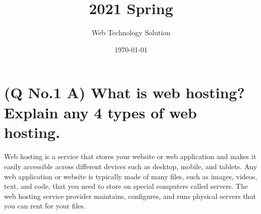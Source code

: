 \documentclass[11pt]{article}
\title{ 2021 Spring}
\author{ Web Technology Solution }
\date{\today}
\begin{document}
\maketitle	
\tableofcontents
\pagebreak



\section{(Q No.1 A) What is web hosting? Explain any 4 types of web hosting.}

\paragraph{}
Web hosting is a service that stores your website or web application and makes it easily accessible across different devices such as desktop, mobile, and tablets. Any web application or website is typically made of many files, such as images, videos, text, and code, that you need to store on special computers called servers. The web hosting service provider maintains, configures, and runs physical servers that you can rent for your files.
\end{document}

